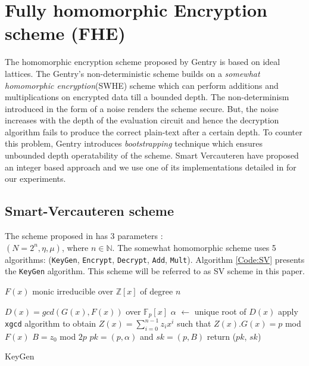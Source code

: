 \documentclass{acm_proc_article-sp}
\begin{document}
\section{Fully homomorphic Encryption scheme (FHE) }

The homomorphic encryption scheme proposed by Gentry \cite{homenc} is based on ideal lattices. The Gentry's non-deterministic scheme builds on a \textit{somewhat homomorphic encryption}(SWHE) scheme which can perform additions and multiplications on encrypted data till a bounded depth. The non-determinism introduced in the form of a noise renders the scheme secure. But, the noise increases with the depth  of the evaluation circuit and hence the decryption algorithm fails to produce the correct plain-text after a certain depth. To counter this problem, Gentry introduces \textit{bootstrapping} technique which ensures unbounded depth operatability of the scheme. Smart Vercauteren \cite{cryptoeprint:2009:571} have proposed an integer based approach and we use one of its implementations detailed in \cite{perl:poster} for our experiments.

\subsection{Smart-Vercauteren  scheme}

The scheme proposed in \cite{cryptoeprint:2009:571} has 3 parameters : \\$(N=2^n, \eta, \mu)$, where $n\in \mathbb{N}$. The somewhat homomorphic scheme uses 5 algorithms: (\texttt{KeyGen}, \texttt{Encrypt}, \texttt{Decrypt}, \texttt{Add}, \texttt{Mult}). Algorithm \autoref{Code:SV} presents the \texttt{KeyGen} algorithm. This scheme will be referred to as SV scheme in this paper.

\linesnumbered
\begin{algorithm}[H]
 \SetVline
 $F(x)$ monic irreducible over $\mathbb{Z}[x]$ of degree $n$\;

$D(x)=gcd(G(x),F(x))$ over $\mathbb{F}_p[x]$\;
$\alpha$ $\leftarrow$ unique root of $D(x)$\;
apply \texttt{xgcd} algorithm to obtain $Z(x) = \sum_{i=0}^{n-1}{z_ix^i} $  such that $Z(x).G(x)=p$ mod $F(x)$\;
$B=z_0$ mod $2p$\;
$pk = (p, \alpha)$ and $sk = (p , B)$\;
return ($pk$, $sk$)\;
\caption{KeyGen\label{Code:SV}}
\end{algorithm}
\end{document}
